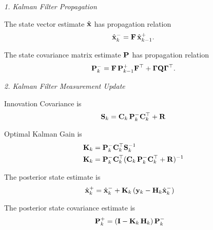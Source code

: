\noindent
\textit{1. Kalman Filter Propagation}

The state vector estimate $\hat{\mathbf{x}}$ has propagation relation
\begin{equation}
	\hat{\mathbf{x}}_{k}^- = \mathbf{F} \, \hat{\mathbf{x}}_{k-1}^+.
\end{equation}

The state covariance matrix estimate $\mathbf{P}$ has propagation relation
\begin{equation}
	\mathbf{P}_{k}^- = \mathbf{F} \, \mathbf{P}_{k-1}^+ \mathbf{F}^\top + \boldsymbol{\Gamma} \mathbf{Q} \boldsymbol{\Gamma}^\top.
\end{equation}

\noindent
\textit{2. Kalman Filter Measurement Update}

Innovation Covariance is 
\begin{equation}
	\mathbf{S}_k = \mathbf{C}_k \, \mathbf{P}^-_k \mathbf{C}_k^\top + \mathbf{R}
\end{equation}

Optimal Kalman Gain is
\begin{align}
	\mathbf{K}_k &= \mathbf{P}_k^- \mathbf{C}_k^\top \mathbf{S}_k^{-1} \nonumber \\
	\mathbf{K}_k &= \mathbf{P}_k^- \mathbf{C}_k^\top (\mathbf{C}_k \, \mathbf{P}_k^- \mathbf{C}_k^\top + \mathbf{R})^{-1}
\end{align}

The posterior state estimate is
\begin{align} \label{eqn:posterior_state_estimate}
	\hat{\mathbf{x}}_k^+ &= \hat{\mathbf{x}}_k^- + \mathbf{K}_k \, (\mathbf{y}_k - \mathbf{H}_k \hat{\mathbf{x}}_k^-)
\end{align}

The posterior state covariance estimate is
\begin{align} \label{eqn:posterior_state_covar}
	\mathbf{P}_k^+ &= (\mathbf{I} - \mathbf{K}_k \, \mathbf{H}_k) \, \mathbf{P}_k^-
\end{align}